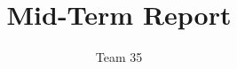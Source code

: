 \documentclass[10pt,twocolumn,letterpaper]{article}
\begin{document}
\title{%
Mid-Term Report}

\author{Team 35}

% 

\end{document}
